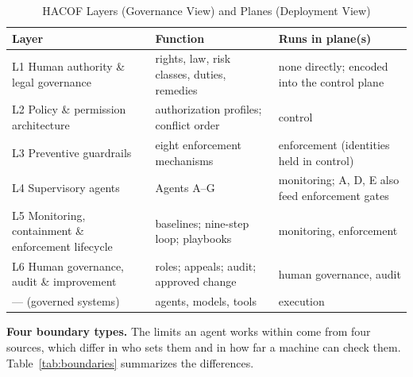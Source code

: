 \documentclass[journal]{IEEEtran}
\newcommand{\hacof}{HACOF}
\begin{document}
\begin{table}[!t]
\caption{\hacof{} Layers (Governance View) and Planes (Deployment View)}
\label{tab:layers}
\centering
\footnotesize
\setlength{\tabcolsep}{3pt}
\begin{tabular}{>{\raggedright\arraybackslash}p{2.35cm}>{\raggedright\arraybackslash}p{2.5cm}>{\raggedright\arraybackslash}p{2.3cm}}
\toprule
\rowcolor{darkblue!15}
\textbf{Layer} & \textbf{Function} & \textbf{Runs in plane(s)} \\
\midrule
L1 Human authority \& legal governance & rights, law, risk classes, duties, remedies & none directly; encoded into the control plane \\
\rowcolor{darkblue!5}
L2 Policy \& permission architecture & authorization profiles; conflict order & control \\
L3 Preventive guardrails & eight enforcement mechanisms & enforcement (identities held in control) \\
\rowcolor{darkblue!5}
L4 Supervisory agents & Agents A--G & monitoring; A, D, E also feed enforcement gates \\
L5 Monitoring, containment \& enforcement lifecycle & baselines; nine-step loop; playbooks & monitoring, enforcement \\
\rowcolor{darkblue!5}
L6 Human governance, audit \& improvement & roles; appeals; audit; approved change & human governance, audit \\
--- (governed systems) & agents, models, tools & execution \\
\bottomrule
\end{tabular}
\end{table}

\textbf{Four boundary types.} The limits an agent works within come from four sources, which differ in who sets them and in how far a machine can check them. Table~\ref{tab:boundaries} summarizes the differences.
\end{document}
